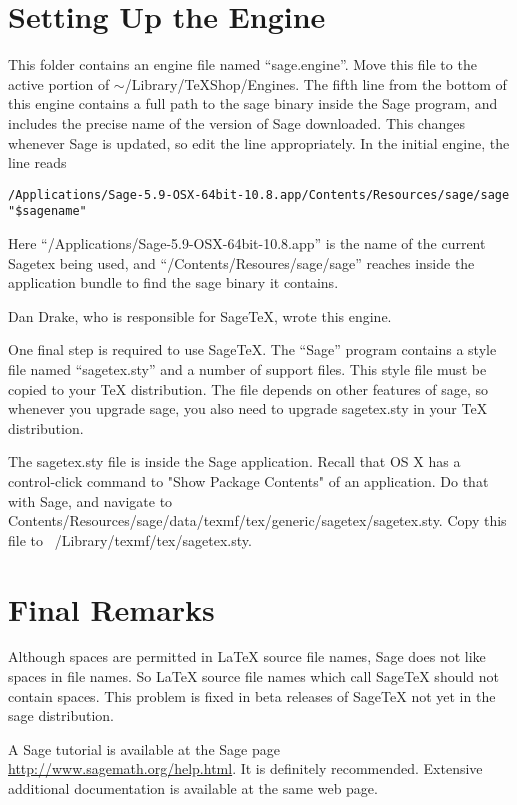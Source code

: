 \documentclass[11pt, oneside]{amsart}
\begin{document}
\section{Setting Up the Engine}

This folder contains an engine file named ``sage.engine''. Move this file to the active portion of $\sim$/Library/TeXShop/Engines. The fifth line from the bottom of this engine contains a full path to the sage binary inside the Sage program, and includes the precise name of the version of Sage downloaded. This changes whenever Sage is updated, so edit the line appropriately. In the initial engine, the line reads
\begin{verbatim}
/Applications/Sage-5.9-OSX-64bit-10.8.app/Contents/Resources/sage/sage "$sagename"
\end{verbatim}
Here ``/Applications/Sage-5.9-OSX-64bit-10.8.app'' is the name of the current Sagetex being
used, and ``/Contents/Resoures/sage/sage'' reaches inside the application bundle to find the
sage binary it contains.

Dan Drake, who is responsible for SageTeX, wrote this engine.

One final step is required to use SageTeX. The ``Sage'' program contains a style file named ``sagetex.sty'' and a number of support files. This style file must be copied to your TeX distribution. The file depends on other features of sage, so whenever you upgrade sage, you also need to upgrade sagetex.sty in your TeX distribution.

The sagetex.sty file is inside the Sage application. Recall that  OS X has a  control-click command to "Show Package Contents" of an application. Do
that with Sage, and navigate to Contents/Resources/sage/data/texmf/tex/generic/sagetex/sagetex.sty.
Copy this file  to ~/Library/texmf/tex/sagetex.sty.



\section{Final Remarks}
Although spaces are permitted in LaTeX source file names, Sage does not like spaces in file names. So LaTeX source file names which call SageTeX should not contain spaces. This problem is fixed in beta releases of SageTeX not yet in the sage distribution.

A Sage tutorial is available at the Sage page \url{http://www.sagemath.org/help.html}. It is definitely recommended. Extensive additional documentation is available at the same web page.
\end{document}
